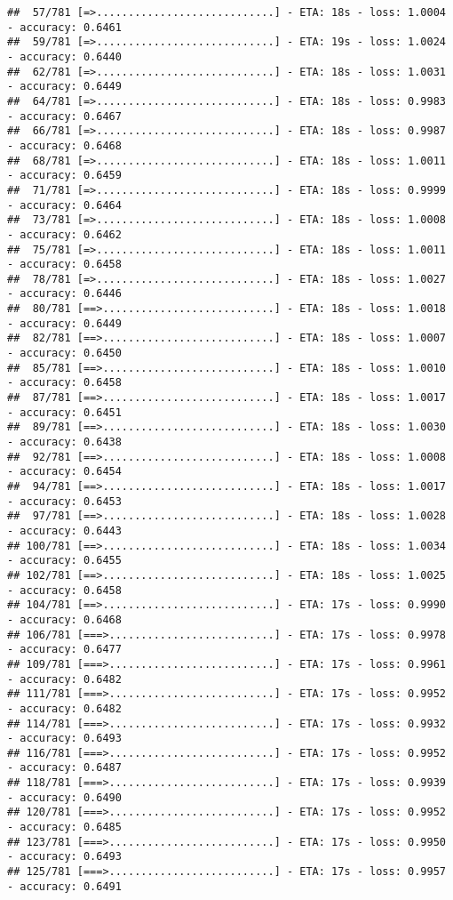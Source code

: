 \documentclass[
]{article}
\begin{document}
\begin{verbatim}
##  57/781 [=>............................] - ETA: 18s - loss: 1.0004 - accuracy: 0.6461
##  59/781 [=>............................] - ETA: 19s - loss: 1.0024 - accuracy: 0.6440
##  62/781 [=>............................] - ETA: 18s - loss: 1.0031 - accuracy: 0.6449
##  64/781 [=>............................] - ETA: 18s - loss: 0.9983 - accuracy: 0.6467
##  66/781 [=>............................] - ETA: 18s - loss: 0.9987 - accuracy: 0.6468
##  68/781 [=>............................] - ETA: 18s - loss: 1.0011 - accuracy: 0.6459
##  71/781 [=>............................] - ETA: 18s - loss: 0.9999 - accuracy: 0.6464
##  73/781 [=>............................] - ETA: 18s - loss: 1.0008 - accuracy: 0.6462
##  75/781 [=>............................] - ETA: 18s - loss: 1.0011 - accuracy: 0.6458
##  78/781 [=>............................] - ETA: 18s - loss: 1.0027 - accuracy: 0.6446
##  80/781 [==>...........................] - ETA: 18s - loss: 1.0018 - accuracy: 0.6449
##  82/781 [==>...........................] - ETA: 18s - loss: 1.0007 - accuracy: 0.6450
##  85/781 [==>...........................] - ETA: 18s - loss: 1.0010 - accuracy: 0.6458
##  87/781 [==>...........................] - ETA: 18s - loss: 1.0017 - accuracy: 0.6451
##  89/781 [==>...........................] - ETA: 18s - loss: 1.0030 - accuracy: 0.6438
##  92/781 [==>...........................] - ETA: 18s - loss: 1.0008 - accuracy: 0.6454
##  94/781 [==>...........................] - ETA: 18s - loss: 1.0017 - accuracy: 0.6453
##  97/781 [==>...........................] - ETA: 18s - loss: 1.0028 - accuracy: 0.6443
## 100/781 [==>...........................] - ETA: 18s - loss: 1.0034 - accuracy: 0.6455
## 102/781 [==>...........................] - ETA: 18s - loss: 1.0025 - accuracy: 0.6458
## 104/781 [==>...........................] - ETA: 17s - loss: 0.9990 - accuracy: 0.6468
## 106/781 [===>..........................] - ETA: 17s - loss: 0.9978 - accuracy: 0.6477
## 109/781 [===>..........................] - ETA: 17s - loss: 0.9961 - accuracy: 0.6482
## 111/781 [===>..........................] - ETA: 17s - loss: 0.9952 - accuracy: 0.6482
## 114/781 [===>..........................] - ETA: 17s - loss: 0.9932 - accuracy: 0.6493
## 116/781 [===>..........................] - ETA: 17s - loss: 0.9952 - accuracy: 0.6487
## 118/781 [===>..........................] - ETA: 17s - loss: 0.9939 - accuracy: 0.6490
## 120/781 [===>..........................] - ETA: 17s - loss: 0.9952 - accuracy: 0.6485
## 123/781 [===>..........................] - ETA: 17s - loss: 0.9950 - accuracy: 0.6493
## 125/781 [===>..........................] - ETA: 17s - loss: 0.9957 - accuracy: 0.6491

\end{verbatim}
\end{document}
